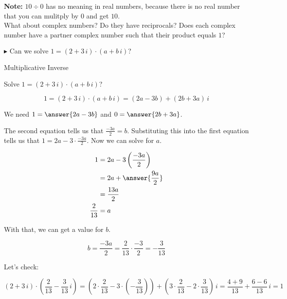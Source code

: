 \documentclass{ximera}
\begin{document}
\textbf{Note:}  $10 \div 0$ has no meaning in real numbers, because there is no real number that you can mulitply by $0$ and get $10$. \\









What about complex numbers?  Do they have reciprocals?  Does each complex number have a partner complex number such that their product equals $1$?



 $\blacktriangleright$ Can we solve $1 = (2 + 3 \, i) \cdot (a + b \, i)  $?



\begin{example} Multiplicative Inverse


Solve $1 = (2 + 3 \, i) \cdot (a + b \, i)  $?


\begin{explanation}

\[   1 = (2 + 3 \, i) \cdot (a + b \, i)  =  (2a - 3b) + (2b+3a) \, i      \]






We need $1 = \answer{2a - 3b}$ and $0 = \answer{2b+3a}$.


The second  equation tells us that $\frac{-3a}{2} = b$.  Substituting this into the first equation tells us that $1 = 2a - 3 \cdot \frac{-3a}{2}$.  Now we can solve for $a$.



\begin{align*}
1     & = 2a - 3 \left( \frac{-3a}{2} \right)  \\
      & =   2a + \answer{\frac{9a}{2}}   \\
      & =    \frac{13a}{2}   \\
  \frac{2}{13}    & =  a
\end{align*}




With that, we can get a value for $b$.   


\[ b = \frac{-3a}{2} = \frac{2}{13}  \cdot \frac{-3}{2} = -\frac{3}{13} \]

Let's check:



\[    (2 + 3 \, i) \cdot \left(\frac{2}{13} - \frac{3}{13} \, i \right)     =   \left( 2 \cdot  \frac{2}{13} - 3 \cdot \left(- \frac{3}{13}\right)\right)  + \left( 3 \cdot \frac{2}{13} - 2 \cdot \frac{3}{13} \right) \, i = \frac{4+9}{13} + \frac{6-6}{13} \, i = 1  \]



\end{explanation}



\end{example}
\end{document}
